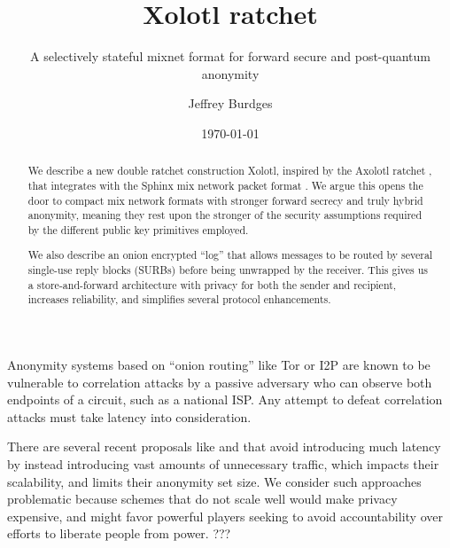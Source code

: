 \documentclass[twoside,letterpaper]{llncs}
\title{Xolotl ratchet}
\subtitle{A selectively stateful mixnet format for forward secure and post-quantum anonymity}
\author{Jeffrey Burdges}
\date{\today}
\begin{document}
\maketitle



\begin{abstract}
We describe a new double ratchet construction Xolotl,
 inspired by the Axolotl ratchet \cite{TextSecure}, that
integrates with the Sphinx mix network packet format \cite{Sphinx}.
We argue this opens the door to compact mix network formats with
stronger forward secrecy and truly hybrid anonymity, meaning they
rest upon the stronger of the security assumptions required by
 the different public key primitives employed.

We also describe an onion encrypted ``log'' that allows messages to
be routed by several single-use reply blocks (SURBs) before being
unwrapped by the receiver.  This gives us a store-and-forward
architecture with privacy for both the sender and recipient,
increases reliability, and simplifies several protocol enhancements.
\end{abstract}



Anonymity systems based on ``onion routing'' \cite{SS03,timing-fc2004}
like Tor or I2P are known to be vulnerable to correlation attacks by
a passive adversary who can observe both endpoints of a circuit, such
as a national ISP.   Any attempt to defeat correlation attacks must
take latency into consideration. 

There are several recent proposals like \cite{Alpenhorn} and
\cite{Dissent} that avoid introducing much latency by instead
introducing vast amounts of unnecessary traffic, which impacts their
scalability, and limits their anonymity set size.  We consider such
approaches problematic because schemes that do not scale well would
make privacy expensive, and might favor powerful players seeking to
avoid accountability over efforts to liberate people from power. ???
\end{document}
